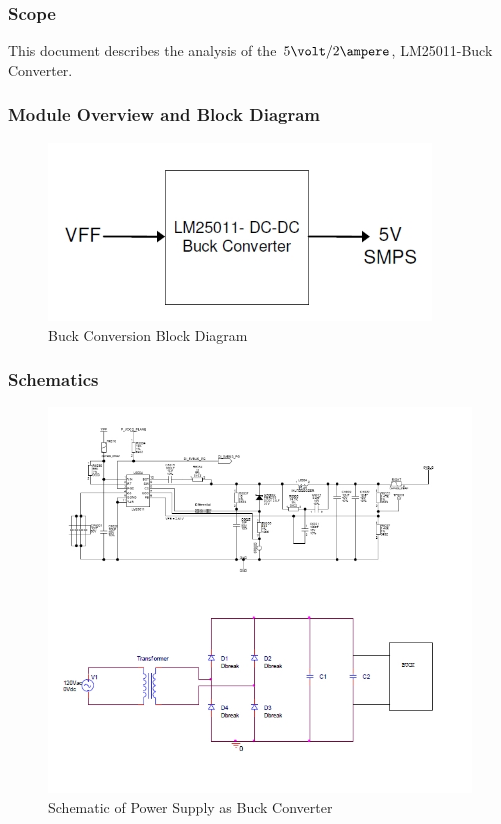 \subsubsection{Scope}
This document describes the analysis of the $5\volt/2\ampere$, LM25011-Buck Converter.
\subsubsection{Module Overview and Block Diagram}
\begin{figure}[H]
\begin{center}
\includegraphics[width=4in]{includes/BlockDiagram}
\caption{Buck Conversion Block Diagram}
\label{fig:1}
\end{center}
\end{figure}

\clearpage
\subsubsection{Schematics}
\begin{figure}[htbp]
\begin{center}
\includegraphics[width=6.5in,angle=90]{includes/Schematics}
\caption{Schematic of Power Supply as Buck Converter}
\label{fig:1}
\end{center}
\end{figure}


